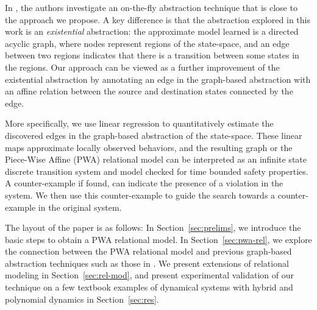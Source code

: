 In \cite{zutshi2014multiple}, the authors investigate an on-the-fly
abstraction technique that is close to the approach we propose. A key
difference is that the abstraction explored in this work is an {\em
existential} abstraction: the approximate model learned is a directed
acyclic graph, where nodes represent regions of the state-space, and
an edge between two regions indicates that there is a transition
between some states in the regions. Our approach can be viewed as a
further improvement of the existential abstraction by annotating an
edge in the graph-based abstraction with an affine relation between
the source and destination states connected by the edge.



More specifically, we use linear regression to quantitatively estimate
the discovered edges in the graph-based abstraction of the
state-space. These linear maps approximate locally observed behaviors,
and the resulting graph or the Piece-Wise Affine (PWA) relational
model can be interpreted as an infinite state discrete transition
system and model checked for time bounded safety properties. A
counter-example if found, can indicate the presence of a violation in
the system.  We then use this counter-example to guide the search
towards a counter-example in the original system.




The layout of the paper is as follows: In Section~\ref{sec:prelims},
we introduce the basic steps to obtain a PWA relational model. In
Section~\ref{sec:pwa-rel}, we explore the connection between the PWA
relational model and previous graph-based abstraction techniques such
as those in \cite{zutshi2014multiple}. We present extensions of
relational modeling in Section~\ref{sec:rel-mod}, and present
experimental validation of our technique on a few textbook examples of
dynamical systems with hybrid and polynomial dynamics in
Section~\ref{sec:res}.
